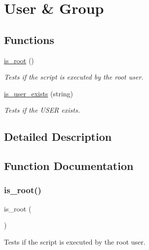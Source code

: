 \hypertarget{group__usergroup}{}\section{User \& Group}
\label{group__usergroup}
\subsection*{Functions}
\begin{DoxyCompactItemize}
\item 
\hyperlink{group__usergroup_ga72b5a7005064e37d0e9547e0ede76263}{is\+\_\+root} ()
\begin{DoxyCompactList}\small\item\em Tests if the script is executed by the root user. \end{DoxyCompactList}\item 
\hyperlink{group__usergroup_ga7e5c33e61b98a256c7489150cf4e14bc}{is\+\_\+user\+\_\+exists} (string)
\begin{DoxyCompactList}\small\item\em Tests if the U\+S\+ER exists. \end{DoxyCompactList}\end{DoxyCompactItemize}


\subsection{Detailed Description}


\subsection{Function Documentation}
\mbox{\label{group__usergroup_ga72b5a7005064e37d0e9547e0ede76263}} 
\subsubsection{\texorpdfstring{is\+\_\+root()}{is\_root()}}
{\footnotesize\ttfamily is\+\_\+root (\begin{DoxyParamCaption}{ }\end{DoxyParamCaption})}



Tests if the script is executed by the root user. 


